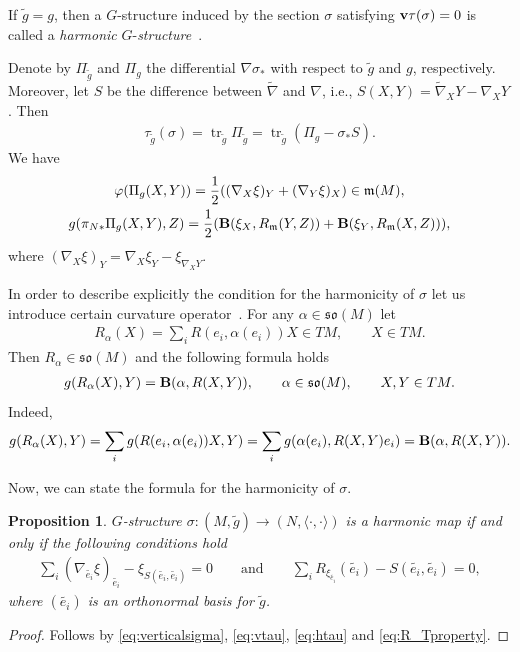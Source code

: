 \documentclass[pdftex]{sigma}
\numberwithin{equation}{section}
\newtheorem{Proposition}[Theorem]{Proposition}
\newcommand{\skal}[2]{\langle #1,#2\rangle}
\begin{document}
If $\tilde g=g$, then a $G$-structure induced by the section $\sigma$ satisfying ${\bf v}\tau(\sigma)=0$ is called a {\it harmonic} $G$-{\it structure}~\cite{gmc2}.

Denote by $\Pi_{\tilde g}$ and $\Pi_g$ the dif\/ferential $\nabla\sigma_{\ast}$ with respect to $\tilde g$ and $g$, respectively. Moreover, let $S$ be the dif\/ference between $\tilde{\nabla}$ and $\nabla$, i.e., $S(X,Y)=\tilde{\nabla}_XY-\nabla_XY$. Then
\begin{gather*}
\tau_{\tilde g}(\sigma)=\operatorname{tr}_{\tilde g}\Pi_{\tilde g}
=\operatorname{tr}_{\tilde g}(\Pi_g-\sigma_{\ast}S).
\end{gather*}
We have \cite{gmc2, cw2}
\begin{gather}
\varphi(\Pi_g(X,Y))=\frac{1}{2}((\nabla_X\xi)_Y+(\nabla_Y\xi)_X)\in\mathfrak{m}(M), \label{eq:vtau}\\
g(\pi_{N\ast}\Pi_g(X,Y),Z) =\frac{1}{2}(
{\bf B}(\xi_X,R_{\mathfrak{m}}(Y,Z))+{\bf B}(\xi_Y,R_{\mathfrak{m}}(X,Z))), \label{eq:htau}
\end{gather}
where $(\nabla_X\xi)_Y=\nabla_X\xi_Y-\xi_{\nabla_XY}$.

In order to describe explicitly the condition for the harmonicity of $\sigma$ let us introduce certain curvature operator~\cite{kn}. For any $\alpha\in\mathfrak{so}(M)$ let
\begin{gather}\label{eq:defRT}
R_{\alpha}(X)=\sum_i R(e_i,\alpha(e_i))X\in TM,\qquad X\in TM.
\end{gather}
Then $R_{\alpha}\in\mathfrak{so}(M)$ and the following formula holds
\begin{gather}\label{eq:R_Tproperty}
g(R_{\alpha}(X),Y)={\bf B}(\alpha,R(X,Y)),\qquad \alpha\in\mathfrak{so}(M),\qquad X,Y\in TM.
\end{gather}
Indeed,
\begin{gather*}
g(R_{\alpha}(X),Y) =\sum_i g(R(e_i,\alpha(e_i))X,Y)=\sum_i g(\alpha(e_i),R(X,Y)e_i) ={\bf B}(\alpha,R(X,Y)).
\end{gather*}

Now, we can state the formula for the harmonicity of $\sigma$.
\begin{Proposition}\label{prop:harmonicsigma1}
$G$-structure $\sigma\colon (M,\tilde{g})\to (N,\skal{\cdot}{\cdot})$ is a harmonic map if and only if the following conditions hold
\begin{gather*}%
\sum_i (\nabla_{\tilde{e_i}}\xi)_{\tilde{e_i}}-\xi_{S(\tilde{e_i},\tilde{e_i})}=0 \qquad\textrm{and}\qquad
\sum_iR_{\xi_{\tilde{e_i}}}(\tilde{e_i})-S(\tilde{e_i},\tilde{e_i})=0,
\end{gather*}
where $(\tilde{e_i})$ is an orthonormal basis for $\tilde{g}$.
\end{Proposition}
\begin{proof}
Follows by \eqref{eq:verticalsigma}, \eqref{eq:vtau}, \eqref{eq:htau} and \eqref{eq:R_Tproperty}.
\end{proof}
\end{document}
